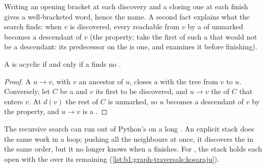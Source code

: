 Writing an opening bracket at each discovery and a closing one at each finish gives a well-bracketed word, hence the
name. A second fact explains what the search finds: when $v$ is discovered, every  reachable from $v$ by a 
of unmarked  becomes a descendant of $v$ (the \emph{} property; take the first  of such a 
that would not be a descendant: its predecessor on the  is one, and examines it before finishing).

\begin{proposition}\label{prop:b1:graph-traversals:back}
A  is acyclic if and only if a  finds no .
\end{proposition}

\begin{proof}
A  $u \to v$, with $v$ an ancestor of $u$, closes a  with the tree  from $v$ to $u$. Conversely, let
$C$ be a  and $v$ its first  to be discovered, and $u \to v$ the  of $C$ that enters $v$. At $d(v)$ the
rest of $C$ is unmarked, so $u$ becomes a descendant of $v$ by the  property, and $u \to v$ is a .
\end{proof}

The recursive search can run out of Python's  on a long . An explicit stack does the same work in a
loop; pushing all the neighbours at once, it discovers the  in the same order, but it no longer knows when a
 finishes. For , the stack holds each open  with the  over its remaining 
(\cref{lst:b1:graph-traversals:kosaraju}).


